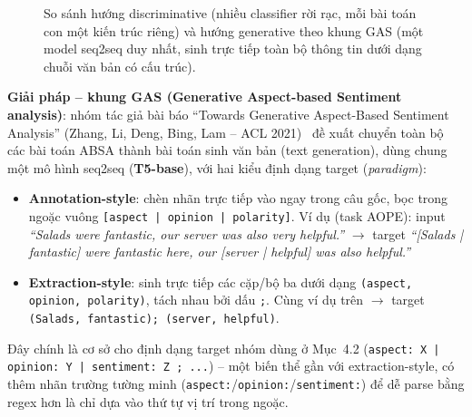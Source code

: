 \documentclass[11pt,a4paper]{article}
\begin{document}
\begin{figure}[h]
\centering
{}
\caption{So sánh hướng discriminative (nhiều classifier rời rạc, mỗi bài
toán con một kiến trúc riêng) và hướng generative theo khung GAS (một
model seq2seq duy nhất, sinh trực tiếp toàn bộ thông tin dưới dạng chuỗi
văn bản có cấu trúc).}
\end{figure}

\textbf{Giải pháp -- khung GAS (Generative Aspect-based Sentiment
analysis)}: nhóm tác giả bài báo ``Towards Generative Aspect-Based
Sentiment Analysis'' (Zhang, Li, Deng, Bing, Lam -- ACL 2021)~\cite{genabsa}
đề xuất chuyển toàn bộ các bài toán ABSA thành bài toán sinh văn bản (text
generation), dùng chung một mô hình seq2seq (\textbf{T5-base}), với hai
kiểu định dạng target (\emph{paradigm}):
\begin{itemize}
    \item \textbf{Annotation-style}: chèn nhãn trực tiếp vào ngay trong
        câu gốc, bọc trong ngoặc vuông \texttt{[aspect | opinion |
        polarity]}. Ví dụ (task AOPE): input \emph{``Salads were
        fantastic, our server was also very helpful.''} $\to$ target
        \emph{``[Salads | fantastic] were fantastic here, our [server |
        helpful] was also helpful.''}
    \item \textbf{Extraction-style}: sinh trực tiếp các cặp/bộ ba dưới
        dạng \texttt{(aspect, opinion, polarity)}, tách nhau bởi dấu
        \texttt{;}. Cùng ví dụ trên $\to$ target \texttt{(Salads,
        fantastic); (server, helpful)}.
\end{itemize}
Đây chính là cơ sở cho định dạng target nhóm dùng ở Mục~4.2
(\texttt{aspect: X | opinion: Y | sentiment: Z ; ...}) -- một biến thể gần
với extraction-style, có thêm nhãn trường tường minh
(\texttt{aspect:}/\texttt{opinion:}/\texttt{sentiment:}) để dễ parse bằng
regex hơn là chỉ dựa vào thứ tự vị trí trong ngoặc.
\end{document}
